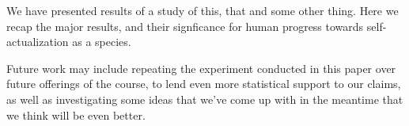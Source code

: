 We have presented results of a study of this, that and some other thing.
Here we recap the major results, and their signficance for human progress
towards self-actualization as a species.

Future work may include repeating the experiment conducted in this
paper over future offerings of the course, to lend even more
statistical support to our claims, as well as investigating some ideas
that we've come up with in the meantime that we think will be even
better.
